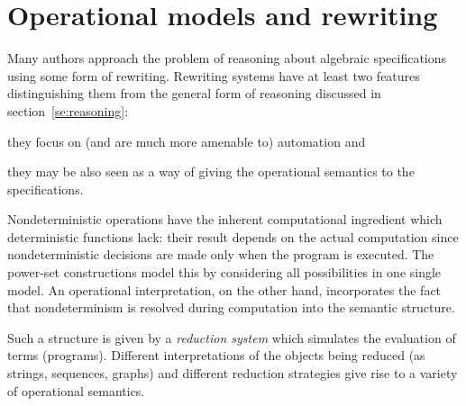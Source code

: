 {\section{Operational models and rewriting}\label{se:rew}
Many authors approach the problem of reasoning about algebraic specifications using some form of 
rewriting. Rewriting systems have at least two features distinguishing them from the general form of 
reasoning discussed in section~\ref{se:reasoning}:
\begin{enum}
\item they focus on (and are much more amenable to) automation and
\item they may be also seen as a way of giving the operational semantics to the specifications.
\end{enum}
Nondeterministic operations have the inherent computational ingredient which deterministic 
functions lack: their result depends on the actual computation since nondeterministic decisions are made 
only when the program is executed. The power-set constructions model this by considering all possibilities 
in one single model. An operational interpretation, on the other hand, incorporates the fact that 
nondeterminism is resolved during computation into the semantic structure.

Such a structure is given by a {\em reduction system} which simulates the evaluation of terms (programs). 
Different interpretations of the objects being reduced (as strings, sequences, graphs) and different reduction 
strategies give rise to a variety of operational semantics. 

}
